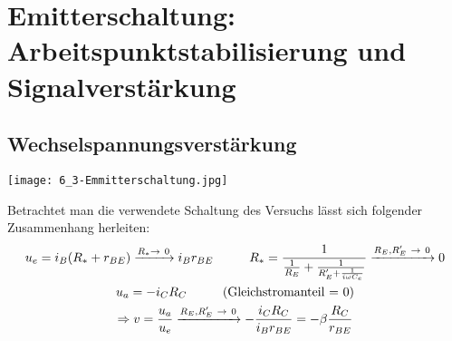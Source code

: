 
\newpage
\section{Emitterschaltung: Arbeitspunktstabilisierung und Signalverstärkung}
\subsection{Wechselspannungsverstärkung}
\begin{center}
    \texttt{[image: 6\_3-Emmitterschaltung.jpg]}
\end{center}
Betrachtet man die verwendete Schaltung des Versuchs lässt sich folgender Zusammenhang herleiten:
\begin{gather}
    u_e = i_B(R_*+r_{BE})\xrightarrow{R_*\rightarrow~0} i_B r_{BE} \hspace*{1cm} R_*=\frac{1}{\frac{1}{R_E}+\frac{1}{R_E' +\frac{1}{i\omega C_e}}} \xrightarrow{R_E,R_E'~\rightarrow~0} 0\\
    u_a = -i_CR_C\hspace*{1cm}\text{(Gleichstromanteil = 0)}\\
    \Rightarrow v=\frac{u_a}{u_e}\xrightarrow{R_E,R_E'~\rightarrow~0}-\frac{i_C R_C}{i_B r_{BE}}=-\beta\frac{R_C}{r_{BE}}
\end{gather}




